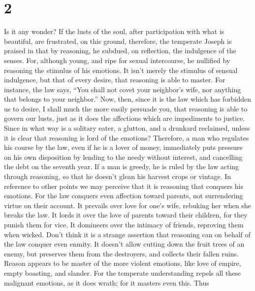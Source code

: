 \hypertarget{section-1}{%
\section{2}\label{section-1}}

 Is it any wonder? If the lusts of the soul, after
participation with what is beautiful, are frustrated,  on
this ground, therefore, the temperate Joseph is praised in that by
reasoning, he subdued, on reflection, the indulgence of the senses.
 For, although young, and ripe for sexual intercourse, he
nullified by reasoning the stimulus of his emotions.  It
isn't merely the stimulus of sensual indulgence, but that of every
desire, that reasoning is able to master.  For instance, the
law says, ``You shall not covet your neighbor's wife, nor anything that
belongs to your neighbor.''  Now, then, since it is the law
which has forbidden us to desire, I shall much the more easily persuade
you, that reasoning is able to govern our lusts, just as it does the
affections which are impediments to justice.  Since in what
way is a solitary eater, a glutton, and a drunkard reclaimed, unless it
is clear that reasoning is lord of the emotions?  Therefore,
a man who regulates his course by the law, even if he is a lover of
money, immediately puts pressure on his own disposition by lending to
the needy without interest, and cancelling the debt on the seventh year.
 If a man is greedy, he is ruled by the law acting through
reasoning, so that he doesn't glean his harvest crops or vintage. In
reference to other points we may perceive that it is reasoning that
conquers his emotions.  For the law conquers even affection
toward parents, not surrendering virtue on their account. 
It prevails over love for one's wife, rebuking her when she breaks the
law.  It lords it over the love of parents toward their
children, for they punish them for vice. It domineers over the intimacy
of friends, reproving them when wicked.  Don't think it is
a strange assertion that reasoning can on behalf of the law conquer even
enmity.  It doesn't allow cutting down the fruit trees of
an enemy, but preserves them from the destroyers, and collects their
fallen ruins.  Reason appears to be master of the more
violent emotions, like love of empire, empty boasting, and slander.
 For the temperate understanding repels all these malignant
emotions, as it does wrath; for it masters even this.  Thus

